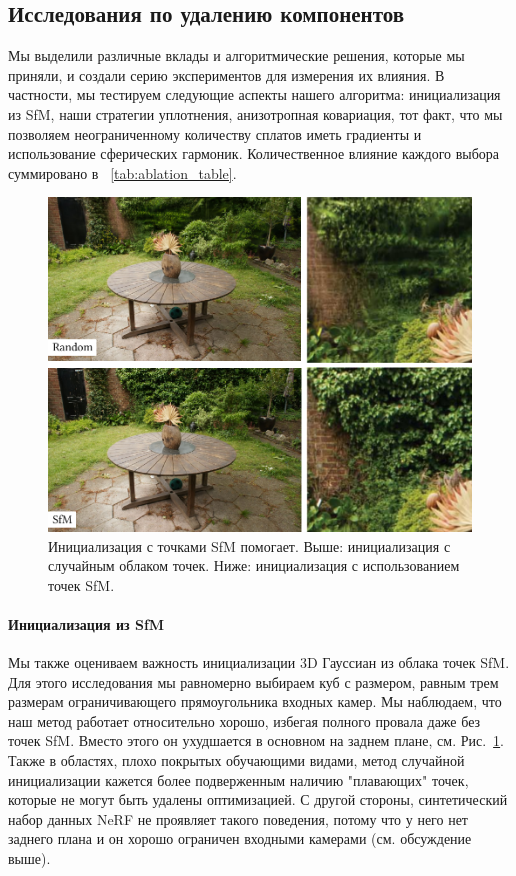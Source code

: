 \subsection{Исследования по удалению компонентов}
\label{sec:ablations}
Мы выделили различные вклады и алгоритмические решения, которые мы приняли, и создали серию экспериментов для измерения их влияния. В частности, мы тестируем следующие аспекты нашего алгоритма: инициализация из SfM, наши стратегии уплотнения, анизотропная ковариация, тот факт, что мы позволяем неограниченному количеству сплатов иметь градиенты
и использование сферических гармоник.
Количественное влияние каждого выбора суммировано в ~\ref{tab:ablation_table}.

\begin{figure}[!h]
    \includegraphics[width=\linewidth]{figures/ablations/random_vs_sfm2.pdf}
    \caption{
        \label{fig:random}
        Инициализация с точками SfM помогает. Выше: инициализация с случайным облаком точек. Ниже: инициализация с использованием точек SfM.
    }
\end{figure}

\paragraph{Инициализация из SfM}
Мы также оцениваем важность инициализации 3D Гауссиан из облака точек SfM.
Для этого исследования мы равномерно выбираем куб с размером, равным трем размерам ограничивающего прямоугольника входных камер. Мы наблюдаем, что наш метод работает относительно хорошо, избегая полного провала даже без точек SfM. Вместо этого он ухудшается в основном на заднем плане, см. Рис.~\ref{fig:random}. Также в областях, плохо покрытых обучающими видами, метод случайной инициализации кажется более подверженным наличию "плавающих" точек, которые не могут быть удалены оптимизацией. С другой стороны, синтетический набор данных NeRF не проявляет такого поведения, потому что у него нет заднего плана и он хорошо ограничен входными камерами (см. обсуждение выше).

